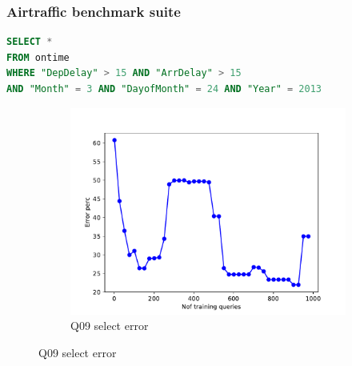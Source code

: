 \begin{frame}[fragile]
\frametitle{Airtraffic benchmark suite}
\begin{lstlisting}[basicstyle=\ttfamily\footnotesize, language=SQL]
SELECT *
FROM ontime
WHERE "DepDelay" > 15 AND "ArrDelay" > 15
AND "Month" = 3 AND "DayofMonth" = 24 AND "Year" = 2013
\end{lstlisting}
	\begin{figure}[!htb]
	  \begin{subfigure}[t]{0.5\textwidth}
	    \includegraphics[scale=0.4]{../figs/airtraffic/airtraffic_sel09_error.pdf}
	    \caption{Q09 select error}
	    \label{fig:sel04}
	  \end{subfigure}
	\end{figure}
\end{frame}


